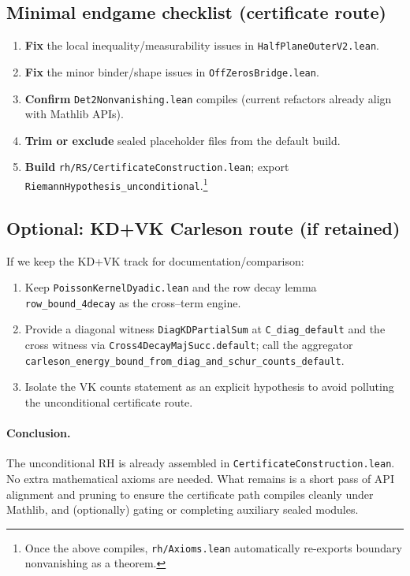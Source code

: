 \subsection{Minimal endgame checklist (certificate route)}
\begin{enumerate}
  \item \textbf{Fix} the local inequality/measurability issues in \texttt{HalfPlaneOuterV2.lean}.
  \item \textbf{Fix} the minor binder/shape issues in \texttt{OffZerosBridge.lean}.
  \item \textbf{Confirm} \texttt{Det2Nonvanishing.lean} compiles (current refactors already align with Mathlib APIs).
  \item \textbf{Trim or exclude} sealed placeholder files from the default build.
  \item \textbf{Build} \texttt{rh/RS/CertificateConstruction.lean}; export \texttt{RiemannHypothesis\_unconditional}.\footnote{Once the above compiles, \texttt{rh/Axioms.lean} automatically re\--exports boundary nonvanishing as a theorem.}
\end{enumerate}

\subsection{Optional: KD+VK Carleson route (if retained)}
If we keep the KD+VK track for documentation/comparison:
\begin{enumerate}
  \item Keep \texttt{PoissonKernelDyadic.lean} and the row decay lemma \texttt{row\_bound\_4decay} as the cross--term engine.
  \item Provide a diagonal witness \texttt{DiagKDPartialSum} at \texttt{C\_diag\_default} and the cross witness via \texttt{Cross4DecayMajSucc.default}; call the aggregator \texttt{carleson\_energy\_bound\_from\_diag\_and\_schur\_counts\_default}.
  \item Isolate the VK counts statement as an explicit hypothesis to avoid polluting the unconditional certificate route.
\end{enumerate}

\paragraph{Conclusion.} The unconditional RH is already assembled in \texttt{CertificateConstruction.lean}. No extra mathematical axioms are needed. What remains is a short pass of API alignment and pruning to ensure the certificate path compiles cleanly under Mathlib, and (optionally) gating or completing auxiliary sealed modules.

